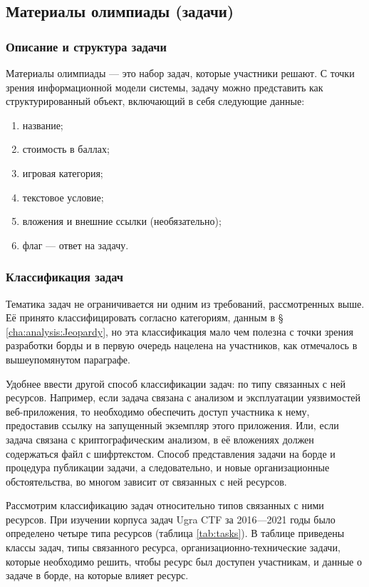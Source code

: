 \subsection{Материалы олимпиады (задачи)}

\subsubsection{Описание и структура задачи}

Материалы олимпиады — это набор задач, которые участники решают. С точки зрения информационной модели системы, задачу можно представить как структурированный объект, включающий в себя следующие данные:

\begin{enumerate}
\item название;
\item стоимость в баллах;
\item игровая категория;
\item текстовое условие;
\item вложения и внешние ссылки (необязательно);
\item флаг — ответ на задачу.
\end{enumerate}

\subsubsection{Классификация задач}
\label{cha:the:classes}

Тематика задач не ограничивается ни одним из требований, рассмотренных выше. Её принято классифицировать согласно категориям, данным в § \ref{cha:analysis:Jeopardy}, но эта классификация мало чем полезна с точки зрения разработки борды и в первую очередь нацелена на участников, как отмечалось в вышеупомянутом параграфе.

Удобнее ввести другой способ классификации задач: по типу связанных с ней ресурсов. Например, если задача связана с анализом и эксплуатации уязвимостей веб-приложения, то необходимо обеспечить доступ участника к нему, предоставив ссылку на запущенный экземпляр этого приложения. Или, если задача связана с криптографическим анализом, в её вложениях должен содержаться файл с шифртекстом. Способ представления задачи на борде и процедура публикации задачи, а следовательно, и новые организационные обстоятельства, во многом зависит от связанных с ней ресурсов.

Рассмотрим классификацию задач относительно типов связанных с ними ресурсов. При изучении корпуса задач Ugra CTF за 2016---2021 годы было определено четыре типа ресурсов (таблица \ref{tab:tasks}). В таблице приведены классы задач, типы связанного ресурса, организационно-технические задачи, которые необходимо решить, чтобы ресурс был доступен участникам, и данные о задаче в борде, на которые влияет ресурс.

